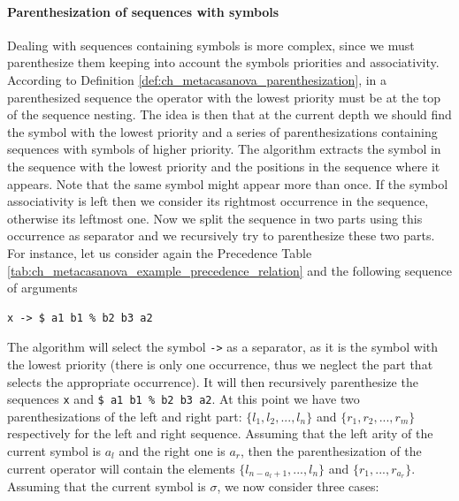 \paragraph{Parenthesization of sequences with symbols}
Dealing with sequences containing symbols is more complex, since we must parenthesize them keeping into account the symbols priorities and associativity. According to Definition \ref{def:ch_metacasanova_parenthesization}, in a parenthesized sequence the operator with the lowest priority must be at the top of the sequence nesting. The idea is then that at the current depth we should find the symbol with the lowest priority and a series of parenthesizations containing sequences with symbols of higher priority. The algorithm extracts the symbol in the sequence with the lowest priority and the positions in the sequence where it appears. Note that the same symbol might appear more than once. If the symbol associativity is left then we consider its rightmost occurrence in the sequence, otherwise its leftmost one. Now we split the sequence in two parts using this occurrence as separator and we recursively try to parenthesize these two parts. For instance, let us consider again the Precedence Table \ref{tab:ch_metacasanova_example_precedence_relation} and the following sequence of arguments

\begin{lstlisting}
x -> $ a1 b1 % b2 b3 a2
\end{lstlisting}

\noindent
The algorithm will select the symbol \texttt{->} as a separator, as it is the symbol with the lowest priority (there is only one occurrence, thus we neglect the part that selects the appropriate occurrence). It will then recursively parenthesize the sequences \texttt{x} and \texttt{\$ a1 b1 \% b2 b3 a2}. At this point we have two parenthesizations of the left and right part: $\lbrace l_1, l_2, ..., l_n \rbrace$ and $\lbrace r_1, r_2, ..., r_m \rbrace$ respectively for the left and right sequence. Assuming that the left arity of the current symbol is $a_l$ and the right one is $a_r$, then the parenthesization of the current operator will contain the elements $\lbrace l_{n - a_l + 1}, ..., l_{n} \rbrace$ and $\lbrace r_1, ..., r_{a_r} \rbrace$. Assuming that the current symbol is $\sigma$, we now consider three cases:

